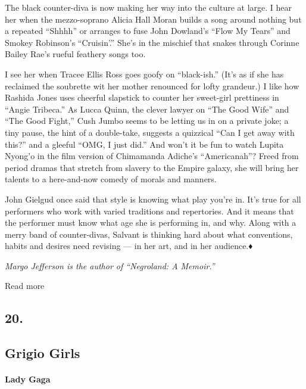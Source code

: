 The black counter-diva is now making her way into the culture at large.
I hear her when the mezzo-soprano Alicia Hall Moran builds a song around
nothing but a repeated ``Shhhh'' or arranges to fuse John Dowland's
``Flow My Tears'' and Smokey Robinson's ``Cruisin'.'' She's in the
mischief that snakes through Corinne Bailey Rae's rueful feathery songs
too.

I see her when Tracee Ellis Ross goes goofy on ``black-ish.'' (It's as
if she has reclaimed the soubrette wit her mother renounced for lofty
grandeur.) I like how Rashida Jones uses cheerful slapstick to counter
her sweet-girl prettiness in ``Angie Tribeca.'' As Lucca Quinn, the
clever lawyer on ``The Good Wife'' and ``The Good Fight,'' Cush Jumbo
seems to be letting us in on a private joke; a tiny pause, the hint of a
double-take, suggests a quizzical ``Can I get away with this?'' and a
gleeful ``OMG, I just did.'' And won't it be fun to watch Lupita Nyong'o
in the film version of Chimamanda Adiche's ``Americanah''? Freed from
period dramas that stretch from slavery to the Empire galaxy, she will
bring her talents to a here-and-now comedy of morals and manners.

John Gielgud once said that style is knowing what play you're in. It's
true for all performers who work with varied traditions and repertories.
And it means that the performer must know what age she is performing in,
and why. Along with a merry band of counter-divas, Salvant is thinking
hard about what conventions, habits and desires need revising --- in her
art, and in her audience.♦

\emph{Margo Jefferson is the author of ``Negroland: A Memoir.''}

Read more

\hypertarget{20}{%
\subsection{20.}\label{20}}

\hypertarget{--grigio-girls}{%
\subsection{\texorpdfstring{ Grigio
Girls}{  Grigio Girls}}\label{--grigio-girls}}

\hypertarget{lady-gaga}{%
\paragraph{Lady Gaga}\label{lady-gaga}}


